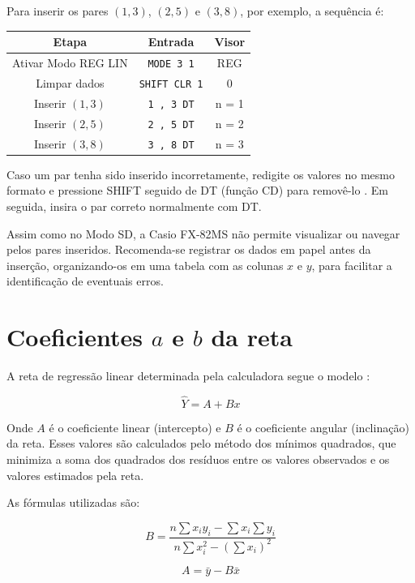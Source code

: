 Para inserir os pares $(1, 3)$, $(2, 5)$ e $(3, 8)$, por exemplo, a sequência é:

\begin{table}[H]
    \centering
    \begin{tabular}{|c|c|c|}
        \hline
        \textbf{Etapa} & \textbf{Entrada} & \textbf{Visor} \\ \hline
        Ativar Modo REG LIN & \texttt{MODE 3 1} & REG \\
        Limpar dados & \texttt{SHIFT CLR 1} & 0 \\
        Inserir $(1, 3)$ & \texttt{1 , 3 DT} & n = 1 \\
        Inserir $(2, 5)$ & \texttt{2 , 5 DT} & n = 2 \\
        Inserir $(3, 8)$ & \texttt{3 , 8 DT} & n = 3 \\ \hline
    \end{tabular}
\end{table}

Caso um par tenha sido inserido incorretamente, redigite os valores no mesmo formato e pressione SHIFT seguido de DT (função CD) para removê-lo \cite{casio2004}. Em seguida, insira o par correto normalmente com DT.

Assim como no Modo SD, a Casio FX-82MS não permite visualizar ou navegar pelos pares inseridos. Recomenda-se registrar os dados em papel antes da inserção, organizando-os em uma tabela com as colunas $x$ e $y$, para facilitar a identificação de eventuais erros.

\section{Coeficientes \texorpdfstring{$a$}{a} e \texorpdfstring{$b$}{b} da reta}

A reta de regressão linear determinada pela calculadora segue o modelo \cite{casio2004}:

\[
    \hat{Y} = A + Bx
\]

Onde $A$ é o coeficiente linear (intercepto) e $B$ é o coeficiente angular (inclinação) da reta. Esses valores são calculados pelo método dos mínimos quadrados, que minimiza a soma dos quadrados dos resíduos entre os valores observados e os valores estimados pela reta.

As fórmulas utilizadas são:

\[
    B = \frac{n \sum x_i y_i - \sum x_i \sum y_i}{n \sum x_i^2 - \left(\sum x_i\right)^2}
\]

\[
    A = \bar{y} - B\bar{x}
\]

